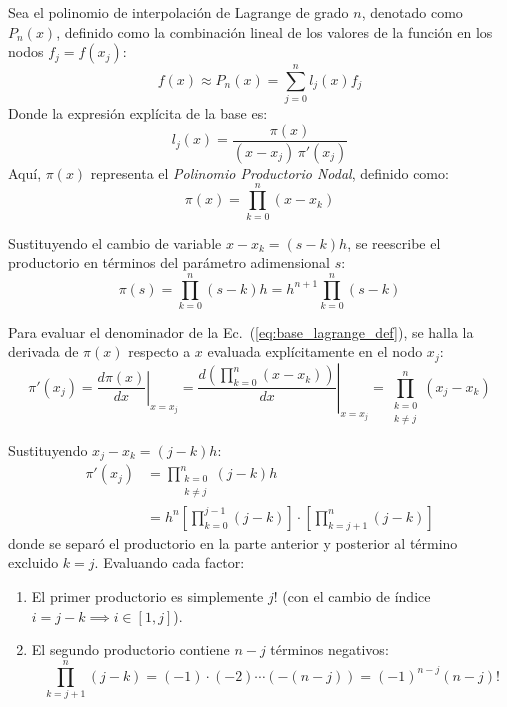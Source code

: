 \documentclass[11pt, a4paper]{article}
\begin{document}
Sea el polinomio de interpolación de Lagrange de grado $n$, denotado como $P_n(x)$, definido como la combinación lineal de los valores de la función en los nodos $f_j = f(x_j)$:
\begin{equation}
	f(x) \approx P_n(x) = \sum_{j=0}^{n} l_j(x) f_j
	\label{eq:lagrange_poly}
\end{equation}
Donde la expresión explícita de la base es:
\begin{equation}
	l_j(x) = \frac{\pi(x)}{(x - x_j)\, \pi'(x_j)}
	\label{eq:base_lagrange_def}
\end{equation}
Aquí, $\pi(x)$ representa el \textit{Polinomio Productorio Nodal}, definido como:
\begin{equation}
	\pi(x) = \prod_{k=0}^{n} (x - x_k)
\end{equation}

Sustituyendo el cambio de variable $x - x_k = (s - k)h$, se reescribe el productorio en términos del parámetro adimensional $s$:
\begin{equation}
	\pi(s) = \prod_{k=0}^{n} (s - k)h = h^{n+1} \prod_{k=0}^{n} (s - k)
	\label{eq:productorio_s}
\end{equation}

Para evaluar el denominador de la Ec.~(\ref{eq:base_lagrange_def}), se halla la derivada de $\pi(x)$ respecto a $x$ evaluada explícitamente en el nodo $x_j$:
\begin{equation}
	\pi'(x_j) = \left. \frac{d\pi(x)}{dx} \right|_{x=x_j} = \left. \frac{ d \left( \prod_{k=0}^{n} (x - x_k) \right) }{dx} \right|_{x=x_j} = \prod_{\substack{k=0 \\ k \neq j}}^{n} (x_j - x_k)
\end{equation}

Sustituyendo $x_j - x_k = (j - k)h$:
\begin{align}
	\pi'(x_j) &= \prod_{\substack{k=0 \\ k \neq j}}^{n} (j - k)h \nonumber \\
	&= h^n \left[ \prod_{k=0}^{j-1} (j - k) \right] \cdot \left[ \prod_{k=j+1}^{n} (j - k) \right]
\end{align}
donde se separó el productorio en la parte anterior y posterior al término excluido $k=j$. Evaluando cada factor:
\begin{enumerate}
	\item El primer productorio es simplemente $j!$ (con el cambio de índice $i = j - k \implies i \in [1, j]$).
	\item El segundo productorio contiene $n-j$ términos negativos:
	      \begin{equation}
		      \prod_{k=j+1}^{n} (j - k) = (-1) \cdot (-2) \cdots (-(n-j)) = (-1)^{n-j} (n-j)!
	      \end{equation}
\end{enumerate}
\end{document}
